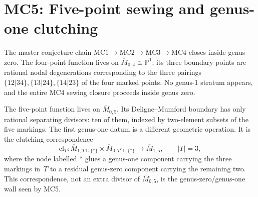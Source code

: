 %
%
%

\chapter{MC5: Five-point sewing and genus-one clutching}
\label{chap:mc5-g0g1-wall-platonic}

\providecommand{\KZ}{\mathrm{KZ}}
\providecommand{\Arn}{\mathrm{Arnold}}
\providecommand{\dbar}{d_{\mathrm{bar}}}
\providecommand{\MMod}{\overline{M}}
\providecommand{\Mbar}{\overline{M}}
\providecommand{\Conf}{\mathrm{Conf}}
\providecommand{\Conford}{\mathrm{Conf}^{\mathrm{ord}}}
\providecommand{\BarOrd}{\bar B^{\mathrm{ch}}}
\providecommand{\Conv}{\mathrm{Conv}}
\providecommand{\MC}{\mathrm{MC}}
\providecommand{\AInf}{A_{\infty}}
\providecommand{\evcore}{\mathrm{ec}}
\providecommand{\fg}{\mathfrak{g}}

The master conjecture chain $\mathrm{MC1} \to \mathrm{MC2} \to \mathrm{MC3} \to
\mathrm{MC4}$ closes inside genus zero. The four-point function lives on
$\Mbar_{0,4} \cong \mathbb{P}^1$; its three boundary points are rational
nodal degenerations corresponding to the three pairings $\{12|34\},
\{13|24\}, \{14|23\}$ of the four marked points. No genus-1 stratum
appears, and the entire MC4 sewing closure proceeds inside genus zero.

The five-point function lives on $\Mbar_{0,5}$. Its Deligne--Mumford
boundary has only rational separating divisors: ten of them, indexed by
two-element subsets of the five markings. The first genus-one datum is a
different geometric operation. It is the clutching correspondence
\[
\mathrm{cl}_{T}\colon
\Mbar_{1,T\cup\{*\}}\times \Mbar_{0,T^{c}\cup\{*\}}
\longrightarrow \Mbar_{1,5},
\qquad |T|=3,
\]
where the node labelled $*$ glues a genus-one component carrying the
three markings in~$T$ to a residual genus-zero component carrying the
remaining two. This correspondence, not an extra divisor of
$\Mbar_{0,5}$, is the genus-zero/genus-one wall seen by MC5.

